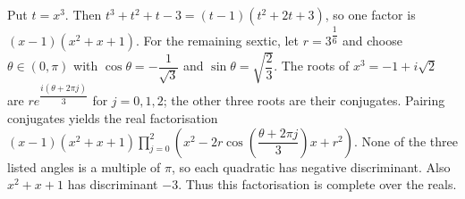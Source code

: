 Put $t=x^3$. Then $t^3+t^2+t-3=(t-1)(t^2+2t+3)$, so one factor is $(x-1)(x^2+x+1)$. For the remaining sextic, let $r=3^{\dfrac{1}{6}}$ and choose $\theta\in(0,\pi)$ with $\cos\theta=-\dfrac{1}{\sqrt3}$ and $\sin\theta=\sqrt{\dfrac{2}{3}}$. The roots of $x^3=-1+i\sqrt2$ are $r e^{\dfrac{i(\theta+2\pi j)}{3}}$ for $j=0,1,2$; the other three roots are their conjugates. Pairing conjugates yields the real factorisation $\boxed{(x-1)(x^2+x+1)\prod_{j=0}^2\left(x^2-2r\cos\left(\dfrac{\theta+2\pi j}{3}\right)x+r^2\right)}$. None of the three listed angles is a multiple of $\pi$, so each quadratic has negative discriminant. Also $x^2+x+1$ has discriminant $-3$. Thus this factorisation is complete over the reals.
